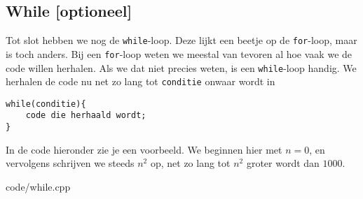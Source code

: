 \documentclass[12pt,a4paper]{article}
\newcommand{\code}{}
\newcommand{\icode}{\lstinline}
\begin{document}
\subsection{While [optioneel]}
Tot slot hebben we nog de \icode{while}-loop. Deze lijkt een beetje op de \icode{for}-loop, maar is toch anders. Bij een \icode{for}-loop weten we meestal van tevoren al hoe vaak we de code willen herhalen. Als we dat niet precies weten, is een \icode{while}-loop handig. We herhalen de code nu net zo lang tot \icode{conditie} onwaar wordt in
\begin{lstlisting}
while(conditie){
	code die herhaald wordt;
}
\end{lstlisting}
In de code hieronder zie je een voorbeeld. We beginnen hier met $n=0$, en vervolgens schrijven we steeds $n^2$ op, net zo lang tot $n^2$ groter wordt dan $1000$.

\code{code/while.cpp}

\clearpage
\end{document}

